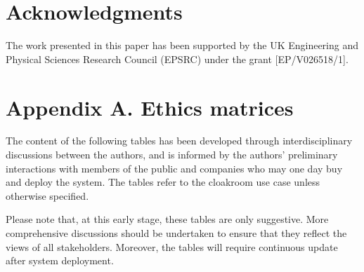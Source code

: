 \documentclass[lettersize,journal]{IEEEtran}
\begin{document}
\section*{Acknowledgments}
The work presented in this paper has been supported by the UK Engineering and Physical Sciences Research Council (EPSRC) under the grant [EP/V026518/1].




\appendices
\section*{Appendix A. Ethics matrices} \label{app:ethics-matrices}
The content of the following tables has been developed through interdisciplinary discussions between the authors, and is informed by the authors’ preliminary interactions with members of the public and companies who may one day buy and deploy the system. The tables refer to the cloakroom use case unless otherwise specified. 

Please note that, at this early stage, these tables are only suggestive. More comprehensive discussions should be undertaken to ensure that they reflect the views of all stakeholders. Moreover, the tables will require continuous update after system deployment. 
\end{document}

